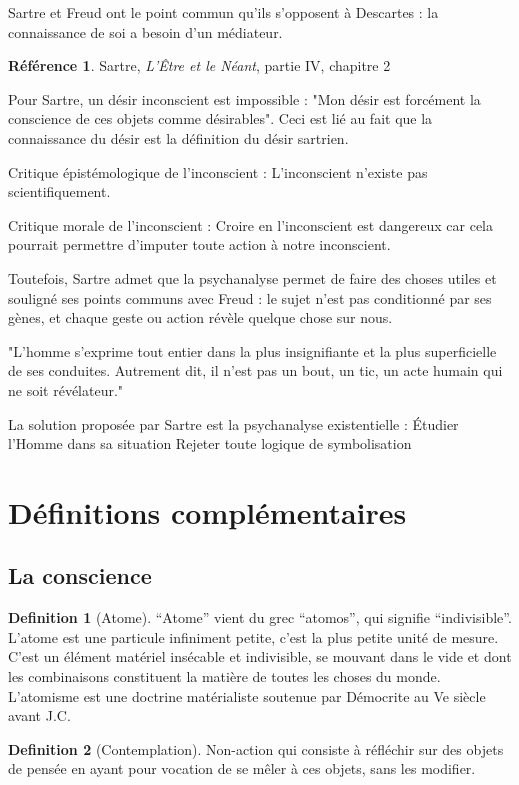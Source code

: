 \documentclass[french]{book}
\theoremstyle{definition}
\newtheorem*{dfn}{Definition}
\newtheorem*{refe}{Référence}
\begin{document}
Sartre et Freud ont le point commun qu'ils s'opposent à Descartes : la connaissance de soi a besoin d'un médiateur.

\begin{refe}
	Sartre, \textit{L'Être et le Néant}, partie IV, chapitre 2
\end{refe}

Pour Sartre, un désir inconscient est impossible : "Mon désir est forcément la conscience de ces objets comme désirables".
Ceci est lié au fait que la connaissance du désir est la définition du désir sartrien.

Critique épistémologique de l'inconscient : L'inconscient n'existe pas scientifiquement.

Critique morale de l'inconscient : Croire en l'inconscient est dangereux car cela pourrait permettre d'imputer toute action à notre inconscient.

Toutefois, Sartre admet que la psychanalyse permet de faire des choses utiles et souligné ses points communs avec Freud : le sujet n'est pas conditionné par ses gènes, et chaque geste ou action révèle quelque chose sur nous.

"L'homme s'exprime tout entier dans la plus insignifiante et la plus superficielle de ses conduites. Autrement dit, il n'est pas un bout, un tic, un acte humain qui ne soit révélateur."

La solution proposée par Sartre est la psychanalyse existentielle :
Étudier l'Homme dans sa situation
Rejeter toute logique de symbolisation

\section{Définitions complémentaires}
\subsection{La conscience}

\begin{dfn}[Atome]
“Atome” vient du grec “atomos”, qui signifie “indivisible”. L’atome est une particule infiniment petite, c’est la plus petite unité de mesure. C’est un élément matériel insécable et indivisible, se mouvant dans le vide et dont les combinaisons constituent la matière de toutes les choses du monde. L’atomisme est une doctrine matérialiste soutenue par Démocrite au Ve siècle avant J.C.
\end{dfn}

\begin{dfn}[Contemplation]
Non-action qui consiste à réfléchir sur des objets de pensée en ayant pour vocation de se mêler à ces objets, sans les modifier.
\end{dfn}
\end{document}
